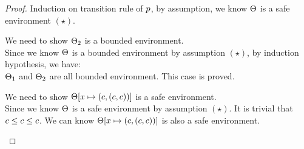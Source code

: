 \documentclass[a4paper,11pt]{article}
\begin{document}
\begin{proof}
Induction on transition rule of $p$, by assumption, we know $\Theta$ is a safe environment $(\star)$.
\begin{itemize}
	We need to show $\Theta_2$ is a bounded environment.\\
	Since we know $\Theta$ is a bounded environment by assumption $(\star)$, by induction hypothesis, we have:
	\\
	$\Theta_1$ and $\Theta_2$ are all bounded environment. This case is proved.

	\caseL{\[
	\inferrule*[right = sample]
	{
		 \fval \leftarrow \edistr^{\diamond}
	}
	{
		\trsenv, \varx \samplel \edistr
		\trsto
		\trsenv[\varx \mapsto (\fval, (\fval, \fval))]
	}
	\]}
	We need to show $\Theta[x \mapsto (c, (c, c))]$ is a safe environment.\\
	Since we know $\Theta$ is a safe environment by assumption $(\star)$.
	It is trivial that $c \leq c \leq c$.
	We can know $\Theta[x \mapsto (c, (c, c))]$ is also a safe environment.


\end{itemize}
\end{proof}
\end{document}
